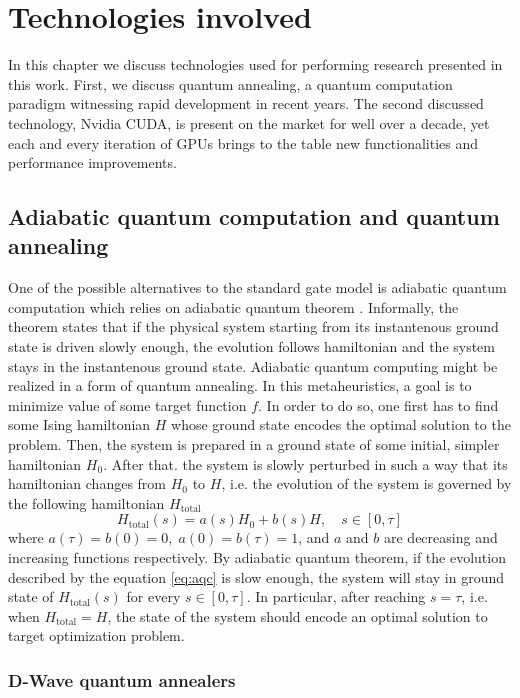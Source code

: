 \chapter{Technologies involved}
\label{chapter:near-term}

 In this chapter we discuss technologies used for performing research presented in this work.
 First, we discuss quantum annealing, a quantum computation paradigm witnessing rapid development in recent years. The second discussed technology, Nvidia CUDA, is present on the market for well over a decade, yet each and every iteration of GPUs brings to the table new functionalities and performance improvements. 


\section{Adiabatic quantum computation and quantum annealing}
One of the possible alternatives to the standard gate model is adiabatic quantum computation which relies on adiabatic quantum theorem \cite{born}. Informally, the theorem states that if the physical system starting from its instantenous ground state is driven slowly enough, the evolution follows hamiltonian and the system stays in the instantenous ground state. Adiabatic quantum computing might be realized in a form of quantum annealing. In this metaheuristics, a goal is to minimize value of some target function $f$. In order to do so, one first has to find some Ising hamiltonian $H$ whose ground state encodes the optimal solution to the problem. Then, the system is prepared in a ground state of some initial, simpler hamiltonian $H_0$. After that. the system is slowly perturbed in such a way that its hamiltonian changes from $H_0$ to $H$, i.e. the evolution of the system is governed by the following hamiltonian $H_\text{total}$
\begin{equation}
    \label{eq:aqc}
    {H}_\text{total}(s) = a(s) {H}_0 + b(s){H}, \quad s \in [0, \tau]
\end{equation}
where $a(\tau) = b(0) = 0, \; a(0) = b(\tau) = 1$, and $a$ and $b$ are decreasing and increasing functions respectively.
By adiabatic quantum theorem, if the evolution described by the equation \eqref{eq:aqc} is slow enough, the system will stay in ground state of ${H}_\text{total}(s)$ for every $s \in [0, \tau]$. In particular, after reaching $s=\tau$, i.e. when $H_\text{total} = H$, the state of the system should encode an optimal solution to target optimization problem.


\subsection{D-Wave quantum annealers}

